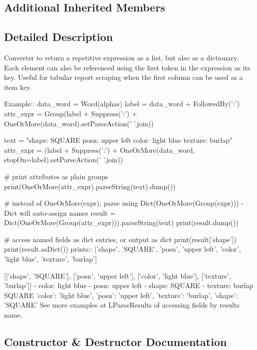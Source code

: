 \subsection*{Additional Inherited Members}


\subsection{Detailed Description}
\begin{DoxyVerb}Converter to return a repetitive expression as a list, but also as a dictionary.
Each element can also be referenced using the first token in the expression as its key.
Useful for tabular report scraping when the first column can be used as a item key.

Example::
    data_word = Word(alphas)
    label = data_word + FollowedBy(':')
    attr_expr = Group(label + Suppress(':') + OneOrMore(data_word).setParseAction(' '.join))

    text = "shape: SQUARE posn: upper left color: light blue texture: burlap"
    attr_expr = (label + Suppress(':') + OneOrMore(data_word, stopOn=label).setParseAction(' '.join))
    
    # print attributes as plain groups
    print(OneOrMore(attr_expr).parseString(text).dump())
    
    # instead of OneOrMore(expr), parse using Dict(OneOrMore(Group(expr))) - Dict will auto-assign names
    result = Dict(OneOrMore(Group(attr_expr))).parseString(text)
    print(result.dump())
    
    # access named fields as dict entries, or output as dict
    print(result['shape'])        
    print(result.asDict())
prints::
    ['shape', 'SQUARE', 'posn', 'upper left', 'color', 'light blue', 'texture', 'burlap']

    [['shape', 'SQUARE'], ['posn', 'upper left'], ['color', 'light blue'], ['texture', 'burlap']]
    - color: light blue
    - posn: upper left
    - shape: SQUARE
    - texture: burlap
    SQUARE
    {'color': 'light blue', 'posn': 'upper left', 'texture': 'burlap', 'shape': 'SQUARE'}
See more examples at L{ParseResults} of accessing fields by results name.
\end{DoxyVerb}
 

\subsection{Constructor \& Destructor Documentation}
\mbox{\label{classsetuptools_1_1__vendor_1_1pyparsing_1_1Dict_a7b96a2cdf8381779910b2c41b782a5a2}} 
